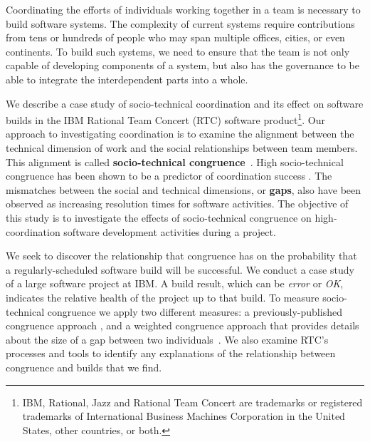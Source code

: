 Coordinating the efforts of individuals working together in a team is
necessary to build software systems. The complexity of current systems require contributions
from tens or hundreds of people who may span multiple offices, cities, or even continents.
To build such systems, we need to ensure that the team is not only capable of
developing components of a system, but also has the governance to be able to integrate the
interdependent parts into a whole.

We describe a case study of socio-technical coordination and its effect on software builds in the IBM\textsuperscript{\textregistered}
Rational Team Concert\textsuperscript{\textregistered} (RTC) software product\footnote{IBM, Rational, Jazz and Rational Team Concert are trademarks or registered trademarks of International Business Machines Corporation in the United States, other countries, or both.}.
Our approach to investigating coordination is to examine the
alignment between the technical dimension of work and the social relationships
between team members. This alignment is called \textbf{socio-technical
congruence}~\cite{cataldo2006:coordination_reqs}. High socio-technical congruence
has been shown to be a predictor of coordination success
\cite{cataldo2006:coordination_reqs,ehrlich2008:gaps}.
The mismatches between the social and technical dimensions, or \textbf{gaps},
also have been observed as increasing resolution times for software activities.
The objective of this study is to investigate the effects of socio-technical congruence on high-coordination software development activities during a project.

We seek to discover the relationship that congruence has on the probability that a regularly-scheduled software build will be successful.
We conduct a case study of a large software project at IBM.  A build result, which can be \emph{error} or \emph{OK}, indicates the relative health of the project up to that build. To
measure socio-technical congruence we apply two different measures: a
previously-published congruence approach \cite{cataldo2006:coordination_reqs},
and a weighted congruence approach that provides details about the size of a
gap between two individuals~\cite{kwan2009:weighted}. We
also examine RTC's processes and tools to identify any
explanations of the relationship between congruence and builds that
we find.

